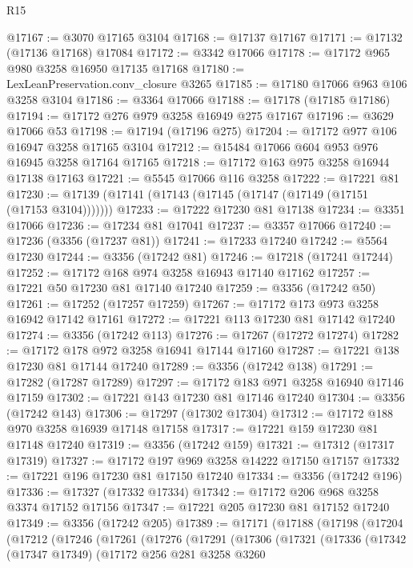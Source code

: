 \begin{lexlean}{R15}
\begin{coremodule}
@17167 := @3070 @17165 @3104
@17168 := @17137 @17167
@17171 := @17132 (@17136 @17168) @17084
@17172 := @3342 @17066
@17178 := @17172 @965 @980 @3258 @16950 @17135 @17168
@17180 := LexLeanPreservation.conv_closure @3265
@17185 := @17180 @17066 @963 @106 @3258 @3104
@17186 := @3364 @17066
@17188 := @17178 (@17185 @17186)
@17194 := @17172 @276 @979 @3258 @16949 @275 @17167
@17196 := @3629 @17066 @53
@17198 := @17194 (@17196 @275)
@17204 := @17172 @977 @106 @16947 @3258 @17165 @3104
@17212 := @15484 @17066 @604 @953 @976 @16945 @3258 @17164 @17165
@17218 := @17172 @163 @975 @3258 @16944 @17138 @17163
@17221 := @5545 @17066 @116 @3258
@17222 := @17221 @81
@17230 := @17139 (@17141 (@17143 (@17145 (@17147 (@17149 (@17151 (@17153 @3104)))))))
@17233 := @17222 @17230 @81 @17138
@17234 := @3351 @17066
@17236 := @17234 @81 @17041
@17237 := @3357 @17066
@17240 := @17236 (@3356 (@17237 @81))
@17241 := @17233 @17240
@17242 := @5564 @17230
@17244 := @3356 (@17242 @81)
@17246 := @17218 (@17241 @17244)
@17252 := @17172 @168 @974 @3258 @16943 @17140 @17162
@17257 := @17221 @50 @17230 @81 @17140 @17240
@17259 := @3356 (@17242 @50)
@17261 := @17252 (@17257 @17259)
@17267 := @17172 @173 @973 @3258 @16942 @17142 @17161
@17272 := @17221 @113 @17230 @81 @17142 @17240
@17274 := @3356 (@17242 @113)
@17276 := @17267 (@17272 @17274)
@17282 := @17172 @178 @972 @3258 @16941 @17144 @17160
@17287 := @17221 @138 @17230 @81 @17144 @17240
@17289 := @3356 (@17242 @138)
@17291 := @17282 (@17287 @17289)
@17297 := @17172 @183 @971 @3258 @16940 @17146 @17159
@17302 := @17221 @143 @17230 @81 @17146 @17240
@17304 := @3356 (@17242 @143)
@17306 := @17297 (@17302 @17304)
@17312 := @17172 @188 @970 @3258 @16939 @17148 @17158
@17317 := @17221 @159 @17230 @81 @17148 @17240
@17319 := @3356 (@17242 @159)
@17321 := @17312 (@17317 @17319)
@17327 := @17172 @197 @969 @3258 @14222 @17150 @17157
@17332 := @17221 @196 @17230 @81 @17150 @17240
@17334 := @3356 (@17242 @196)
@17336 := @17327 (@17332 @17334)
@17342 := @17172 @206 @968 @3258 @3374 @17152 @17156
@17347 := @17221 @205 @17230 @81 @17152 @17240
@17349 := @3356 (@17242 @205)
@17389 := @17171
    (@17188
      (@17198
        (@17204
          (@17212
            (@17246
              (@17261
                (@17276
                  (@17291
                    (@17306
                      (@17321
                        (@17336
                          (@17342
                            (@17347 @17349)
                            (@17172
                              @256
                              @281
                              @3258
                              @3260

\end{coremodule}
\end{lexlean}
